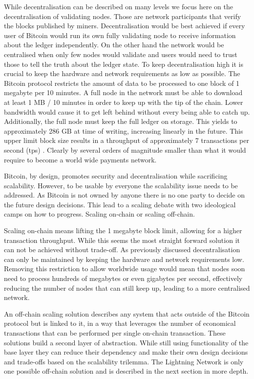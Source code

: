 \documentclass[final]{fhnwreport}       %
\begin{document}
While decentralisation can be described on many levels we focus here on the decentralisation of validating nodes. Those are network participants that verify the blocks published by miners. Decentralisation would be best achieved if  every user of Bitcoin would run its own fully validating node to receive information about the ledger independently. On the other hand the network would be centralised when only few nodes would validate and users would need to trust those to tell the truth about the ledger state. To keep decentralisation high it is crucial to keep the hardware and network requirements as low as possible. The Bitcoin protocol restricts the amount of data to be processed to one block of 1 megabyte per 10 minutes. A full node in the network must be able to download at least 1 MB / 10 minutes in order to keep up with the tip of the chain. Lower bandwidth would cause it to get left behind without every being able to catch up. Additionally, the full node must keep the full ledger on storage. This yields to approximately 286 GB \cite{noauthor_blocks-size_nodate} at time of writing, increasing linearly in the future. This upper limit block size results in a throughput of approximately 7 transactions per second (tps) \cite{poon_bitcoin_2016}. Clearly by several orders of magnitude smaller than what it would require to become a world wide payments network. 

Bitcoin, by design, promotes security and decentralisation while sacrificing scalability. However, to be usable by everyone the scalability issue needs to be addressed. As Bitcoin is not owned by anyone there is no one party to decide on the future design decisions. This lead to a scaling debate with two ideological camps on how to progress. Scaling on-chain or scaling off-chain.

Scaling on-chain means lifting the 1 megabyte block limit, allowing for a higher transaction throughput. While this seems the most straight forward solution it can not be achieved without trade-off. As previously discussed decentralisation can only be maintained by keeping the hardware and network requirements low. Removing this restriction to allow worldwide usage would mean that nodes soon need to process hundreds of megabytes or even gigabytes per second, effectively reducing the number of nodes that can still keep up, leading to a more centralised network. 

An off-chain scaling solution describes any system that acts outside of the Bitcoin protocol but is linked to it, in a way that leverages the number of economical transactions that can be performed per single on-chain transaction. These solutions build a second layer  of abstraction. While still using functionality of the base layer  they can reduce their dependency and make their own design decisions and trade-offs based on the scalability trilemma. The Lightning Network is only one possible off-chain solution and is described in the next section in more depth. 
\end{document}
